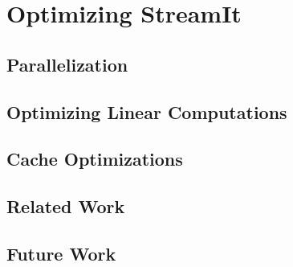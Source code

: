\chapter{Optimizing StreamIt}
\label{chap:optimizing}

\section{Parallelization}

\section{Optimizing Linear Computations}

\section{Cache Optimizations}

\section{Related Work}

\section{Future Work}





